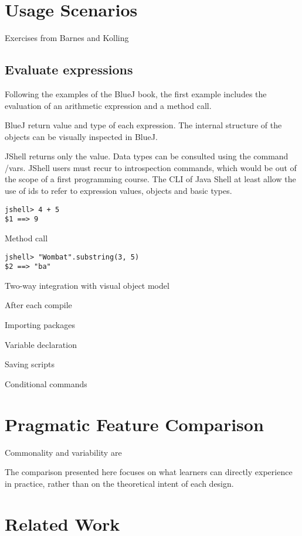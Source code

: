 \documentclass{article}
\begin{document}

\section{Usage Scenarios}

Exercises from Barnes and Kolling

\subsection{Evaluate expressions}

Following the examples of the BlueJ book, the first example includes the evaluation of an arithmetic expression and a method call.

BlueJ return value and type of each expression. 
The internal structure of the objects can be visually inspected in BlueJ. 

JShell returns only the value. Data types can be consulted using the command /vars.
JShell users must recur to introspection commands, which would be out of the scope of a first programming course. 
The CLI of Java Shell at least allow the use of ids to refer to expression values,  objects  and basic types.

\begin{lstlisting}
jshell> 4 + 5
$1 ==> 9
\end{lstlisting}

Method call
\begin{lstlisting}
jshell> "Wombat".substring(3, 5)
$2 ==> "ba"
\end{lstlisting}
Two-way integration with visual object model

After each compile

Importing packages

Variable declaration

Saving scripts

Conditional commands


\section{Pragmatic Feature Comparison}
Commonality and variability are

The comparison presented here focuses on what learners can directly experience in practice, rather than on the theoretical intent of each design.

\section{Related Work}
\end{document}
